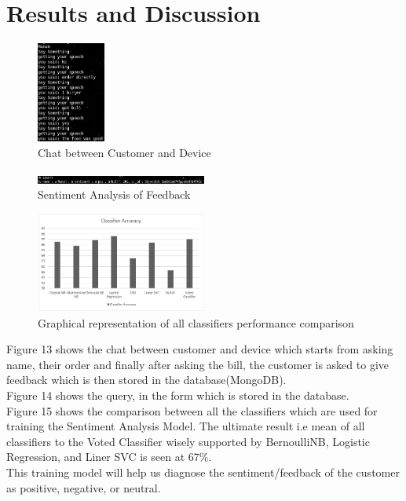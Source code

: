 \documentclass[conference]{IEEEtran}
\begin{document}
\section{Results and Discussion}
\begin{figure}[!ht]
	\centering
	\includegraphics[width=0.2\textwidth]{input.png}
	\caption{Chat between Customer and Device}
\end{figure}

\begin{figure}[!ht]
	\centering
	\includegraphics[width=0.5\textwidth]{output.png}
	\caption{Sentiment Analysis of Feedback}
\end{figure}

\begin{figure}[!ht]
	\centering
	\includegraphics[width=0.5\textwidth]{R2.png}
	\caption{Graphical representation of all classifiers performance comparison}
\end{figure}
Figure 13 shows the chat between customer and device which starts from asking name, their order and finally after asking the bill, the customer is asked to give feedback which is then stored in the database(MongoDB).\\
Figure 14 shows the query, in the form which is stored in the database.\\
Figure 15 shows the comparison between all the classifiers which are used for training the Sentiment Analysis Model. The ultimate result i.e mean of all classifiers to the Voted Classifier wisely supported by BernoulliNB, Logistic Regression, and Liner SVC is seen at 67\%.\\
This training model will help us diagnose the sentiment/feedback of the customer as positive, negative, or neutral.
\end{document}
